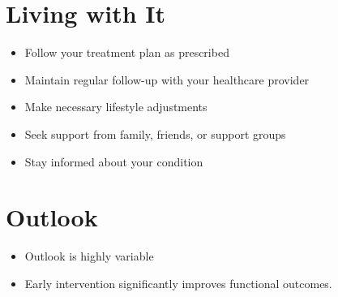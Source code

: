 \section{Living with It}
\begin{itemize}[noitemsep]
  \item Follow your treatment plan as prescribed
  \item Maintain regular follow-up with your healthcare provider
  \item Make necessary lifestyle adjustments
  \item Seek support from family, friends, or support groups
  \item Stay informed about your condition
\end{itemize}
\section{Outlook}
\begin{itemize}[noitemsep]
  \item Outlook is highly variable
  \item Early intervention significantly improves functional outcomes.
\end{itemize}

